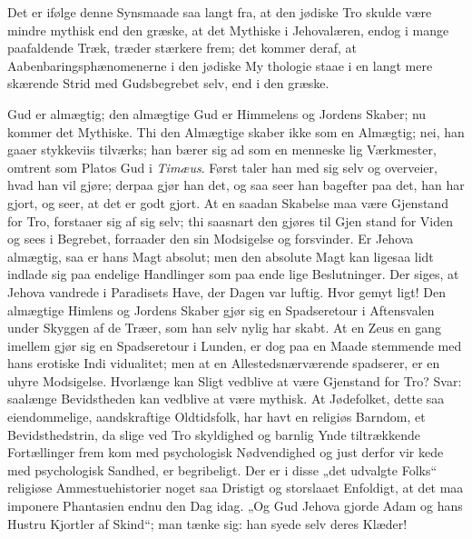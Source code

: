 \documentclass[12pt]{book}
\newcommand{\opage}[1]{\marginnote{\footnotesize\textit{[#1]}}}
\begin{document}
Det er ifølge denne Synsmaade saa langt fra, at
den jødiske Tro skulde være mindre mythisk end den
græske, at det Mythiske i Jehovalæren, endog i mange
paafaldende Træk, træder stærkere frem; det kommer
deraf, at Aabenbaringsphænomenerne i den jødiske My\-%
thologie staae i en langt mere skærende Strid med
Gudsbegrebet selv, end i den græske.

Gud er almægtig; den almægtige Gud er Himmelens
og Jordens Skaber; nu kommer det Mythiske. Thi den
Almægtige skaber ikke som en Almægtig; nei, han gaaer
stykkeviis tilværks; han bærer sig ad som en menneske\-%
lig Værkmester, omtrent som Platos Gud i \emph{Timæus}.
Først taler han med sig selv og overveier, hvad han
vil gjøre; derpaa gjør han det, og saa seer han bagefter
paa det, han har gjort, og seer, at det er godt gjort.
At en saadan Skabelse maa være Gjenstand for Tro,
\opage{98}\setcounter{footnote}{0}%
forstaaer sig af sig selv; thi saasnart den gjøres til Gjen\-%
stand for Viden og sees i Begrebet, forraader den sin
Modsigelse og forsvinder. Er Jehova almægtig, saa er
hans Magt absolut; men den absolute Magt kan ligesaa
lidt indlade sig paa endelige Handlinger som paa ende\-%
lige Beslutninger. Der siges, at Jehova vandrede i
Paradisets Have, der Dagen var luftig. Hvor gemyt\-%
ligt! Den almægtige Himlens og Jordens Skaber gjør
sig en Spadseretour i Aftensvalen under Skyggen af de
Træer, som han selv nylig har skabt. At en Zeus en\-%
gang imellem gjør sig en Spadseretour i Lunden, er
dog paa en Maade stemmende med hans erotiske Indi\-%
vidualitet; men at en Allestedsnærværende spadserer, er
en uhyre Modsigelse. Hvorlænge kan Sligt vedblive
at være Gjenstand for Tro? Svar: saalænge Bevidstheden
kan vedblive at være mythisk. At Jødefolket, dette saa
eiendommelige, aandskraftige Oldtidsfolk, har havt en
religiøs Barndom, et Bevidsthedstrin, da slige ved Tro\-%
skyldighed og barnlig Ynde tiltrækkende Fortællinger frem\-%
kom med psychologisk Nødvendighed og just derfor vir\-%
kede med psychologisk Sandhed, er begribeligt. Der er
i disse „det udvalgte Folks“ religiøse Ammestuehistorier
noget saa Dristigt og storslaaet Enfoldigt, at det maa
imponere Phantasien endnu den Dag idag. „Og Gud
Jehova gjorde Adam og hans Hustru Kjortler af Skind“;
man tænke sig: han syede selv deres Klæder!
\end{document}
